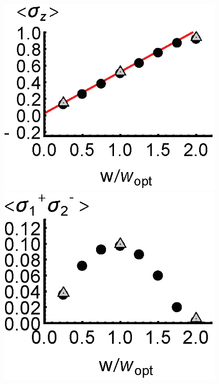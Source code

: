 \documentclass[aps,
twocolumn,
showpacs,
superscriptaddress,groupedaddress]{revtex4}
\begin{document}
\begin{figure}
\begin{center}
	\includegraphics[scale =0.38] {N40LaserSZ.eps}
	\hspace{-5.0mm} \includegraphics[scale =0.38] {N40LaserSPSM.eps}

\end{center}
\end{figure}
\end{document}
